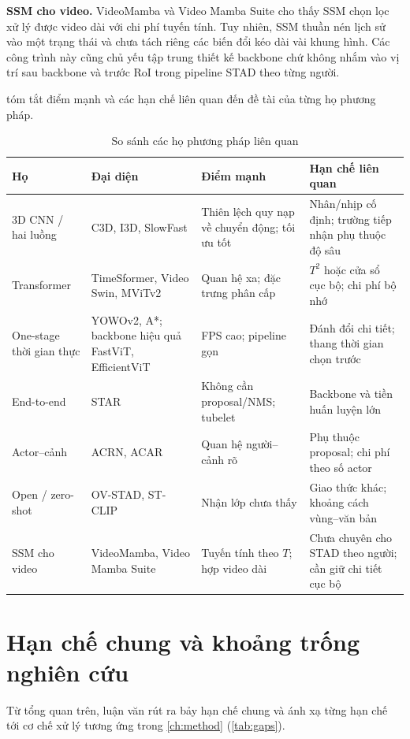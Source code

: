 \textbf{SSM cho video.} VideoMamba \cite{li2024videomamba} và Video Mamba Suite \cite{chen2024videomambasuite} cho thấy SSM chọn lọc xử lý được video dài với chi phí tuyến tính. Tuy nhiên, SSM thuần nén lịch sử vào một trạng thái và chưa tách riêng các biến đổi kéo dài vài khung hình. Các công trình này cũng chủ yếu tập trung thiết kế backbone chứ không nhắm vào vị trí sau backbone và trước RoI trong pipeline STAD theo từng người.

 tóm tắt điểm mạnh và các hạn chế liên quan đến đề tài của từng họ phương pháp.

\begin{table}[H]
\centering
\caption{So sánh các họ phương pháp liên quan}
\label{tab:families}
\small
\begin{tabularx}{\textwidth}{lXXX}
\toprule
\textbf{Họ} & \textbf{Đại diện} & \textbf{Điểm mạnh} & \textbf{Hạn chế liên quan}\\
\midrule
3D CNN / hai luồng & C3D, I3D, SlowFast & Thiên lệch quy nạp về chuyển động; tối ưu tốt & Nhân/nhịp cố định; trường tiếp nhận phụ thuộc độ sâu\\
Transformer & TimeSformer, Video Swin, MViTv2 & Quan hệ xa; đặc trưng phân cấp & $T^2$ hoặc cửa sổ cục bộ; chi phí bộ nhớ\\
One-stage thời gian thực & YOWOv2, A*; backbone hiệu quả FastViT, EfficientViT & FPS cao; pipeline gọn & Đánh đổi chi tiết; thang thời gian chọn trước\\
End-to-end & STAR & Không cần proposal/NMS; tubelet & Backbone và tiền huấn luyện lớn\\
Actor--cảnh & ACRN, ACAR & Quan hệ người--cảnh rõ & Phụ thuộc proposal; chi phí theo số actor\\
Open / zero-shot & OV-STAD, ST-CLIP & Nhận lớp chưa thấy & Giao thức khác; khoảng cách vùng--văn bản\\
SSM cho video & VideoMamba, Video Mamba Suite & Tuyến tính theo $T$; hợp video dài & Chưa chuyên cho STAD theo người; cần giữ chi tiết cục bộ\\
\bottomrule
\end{tabularx}
\end{table}

\section{Hạn chế chung và khoảng trống nghiên cứu}
\label{sec:gaps}

Từ tổng quan trên, luận văn rút ra bảy hạn chế chung và ánh xạ từng hạn chế tới cơ chế xử lý tương ứng trong \cref{ch:method} (\cref{tab:gaps}).

